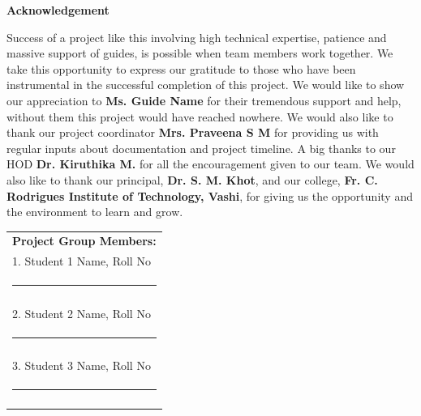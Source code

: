 
\begin{centering}
    \large
{\LARGE\bf Acknowledgement}\\
\end{centering}
    
\justifying
Success of a project like this involving high technical expertise, patience and massive support of guides, is possible when team members work together. We take this opportunity to express our gratitude to those who have been instrumental in the successful completion of this project. We would like to show our appreciation to \textbf{Ms. Guide Name} for their tremendous support and help, without them this project would have reached nowhere. We would also like to thank our project coordinator \textbf{Mrs. Praveena S M} for providing us with regular inputs about documentation and project timeline. A big thanks to our HOD \textbf{Dr. Kiruthika M.} for all the encouragement given to our team. We would also like to thank our principal, \textbf{Dr. S. M. Khot}, and our college, \textbf{Fr. C. Rodrigues Institute of Technology, Vashi}, for giving us the opportunity and the environment to learn and grow.

\vspace{3cm}
\hfill%
\begin{tabular}[t]{l@{}}
\vspace{1cm}

{\textbf{Project Group Members:}} \\ 
\vspace{1cm}

1. Student 1 Name, Roll No \\
\noindent\rule{5cm}{0.10pt} \\
\\
\vspace{1cm}

2. Student 2 Name, Roll No \\
\noindent\rule{5cm}{0.10pt} \\
\\
\vspace{1cm}

3. Student 3 Name, Roll No \\
 \noindent\rule{5cm}{0.10pt}
\\
\vspace{1cm}
\end{tabular}


